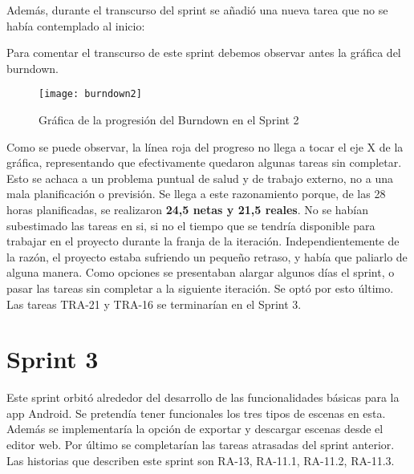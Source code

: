 Además, durante el transcurso del sprint se añadió una nueva tarea que no se había contemplado al inicio:

\begin{table}[H]
\label{TRA-22}
\end{table}

Para comentar el transcurso de este sprint debemos observar antes la gráfica del burndown.

\begin{figure}[h]
    \centering
    \texttt{[image: burndown2]}
    \caption[Burndown Sprint 2]{Gráfica de la progresión del Burndown en el Sprint 2}
\end{figure}

Como se puede observar, la línea roja del progreso no llega a tocar el eje X de la gráfica, representando que efectivamente quedaron algunas tareas sin completar. Esto se achaca a un problema puntual de salud y de trabajo externo, no a una mala planificación o previsión. Se llega a este razonamiento porque, de las 28 horas planificadas, se realizaron \textbf{24,5 netas y 21,5 reales}. No se habían subestimado las tareas en si, si no el tiempo que se tendría disponible para trabajar en el proyecto durante la franja de la iteración. Independientemente de la razón, el proyecto estaba sufriendo un pequeño retraso, y había que paliarlo de alguna manera. Como opciones se presentaban alargar algunos días el sprint, o pasar las tareas sin completar a la siguiente iteración. Se optó por esto último. Las tareas TRA-21 y TRA-16 se terminarían en el Sprint 3.

\section{Sprint 3}

Este sprint orbitó alrededor del desarrollo de las funcionalidades básicas para la app Android. Se pretendía tener funcionales los tres tipos de escenas en esta. Además se implementaría la opción de exportar y descargar escenas desde el editor web. Por último se completarían las tareas atrasadas del sprint anterior. Las historias que describen este sprint son  RA-13, RA-11.1, RA-11.2, RA-11.3.


